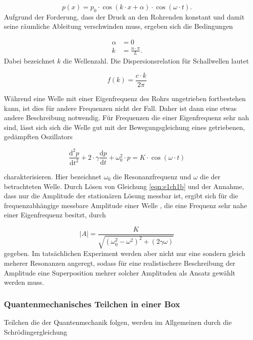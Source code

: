\begin{equation}
  \label{eqn:e4ch1}
  p(x) = p_{0} \cdot \cos\left( k \cdot x + \alpha \right) \cdot \cos\left( \omega \cdot t \right).
\end{equation}
Aufgrund der Forderung, dass der Druck an den Rohrenden konstant und damit seine
räumliche Ableitung verschwinden muss, ergeben sich die Bedingungen


\begin{align}
  \alpha &= 0 \\
  k &= \frac{n \cdot \pi}{L}.
\end{align}
Dabei bezeichnet $k$ die Wellenzahl.
Die Dispersionsrelation für Schallwellen lautet


\begin{equation}
  \label{eqn:e7ch1}
  f(k) = \frac{c \cdot k}{2\pi}
\end{equation}


Während eine Welle mit einer Eigenfrequenz des Rohrs ungetrieben fortbestehen kann, ist dies für andere
Frequenzen nicht der Fall. Daher ist dann eine etwas andere Beschreibung notwendig. Für Frequenzen
die einer Eigenfrequenz sehr nah sind, lässt sich sich die Welle gut mit der Bewegungsgleichung
eines getriebenen, gedämpften Oszillators


\begin{equation}
  \label{eqn:e1ch1b}
  \frac{\mathrm{d}^2 p}{\mathrm{d}t^2} + 2 \cdot \gamma \frac{\mathrm{d} p}{\mathrm{d}t} + \omega_{0}^2 \cdot p = K \cdot \cos\left( \omega \cdot t \right)
\end{equation}

charakterisieren.
Hier bezeichnet $\omega_{0}$ die Resonanzfrequenz und $\omega$ die der betrachteten Welle.
Durch Lösen von Gleichung \eqref{eqn:e1ch1b} und der Annahme, dass nur die Amplitude der stationären Lösung
messbar ist, ergibt sich für die frequenzabhängige messbare Amplitude einer Welle , die eine Frequenz sehr nahe
einer Eigenfrequenz besitzt, durch


\begin{equation}
  \label{eqn:e2ch1b}
  |A| = \frac{K}{\sqrt{\left( \omega_{0}^2 - \omega^2 \right)^2 + \left( 2 \gamma \omega \right)}}
\end{equation}
gegeben.
Im tatsächlichen Experiment werden aber nicht nur eine sondern gleich meherer Resonanzen angeregt, sodass
für eine realistischere Beschreibung der Amplitude eine Superposition mehrer solcher Amplituden als Ansatz gewählt werden muss.

\subsubsection{Quantenmechanisches Teilchen in einer Box}
\label{subsubsec:tch12}
Teilchen die der Quantenmechanik folgen, werden im Allgemeinen
durch die Schrödingergleichung


